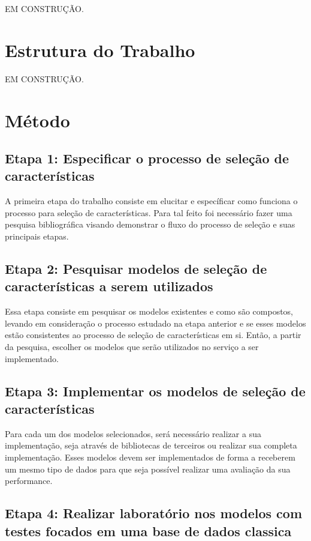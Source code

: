 EM CONSTRUÇÃO.

\section{Estrutura do Trabalho}

EM CONSTRUÇÃO.

\section{Método}

\subsection{Etapa 1: Especificar o processo de seleção de características}

A primeira etapa do trabalho consiste em elucitar e específicar como funciona o processo para seleção de características. Para tal feito foi necessário fazer uma pesquisa bibliográfica visando demonstrar o fluxo do processo de seleção e suas principais etapas.

\subsection{Etapa 2: Pesquisar modelos de seleção de características a serem utilizados}

Essa etapa consiste em pesquisar os modelos existentes e como são compostos, levando em consideração o processo estudado na etapa anterior e se esses modelos estão consistentes ao processo de seleção de características em si. Então, a partir da pesquisa, escolher os modelos que serão utilizados no serviço a ser implementado.

\subsection{Etapa 3: Implementar os modelos de seleção de características}

Para cada um dos modelos selecionados, será necessário realizar a sua implementação, seja através de bibliotecas de terceiros ou realizar sua completa implementação. Esses modelos devem ser implementados de forma a receberem um mesmo tipo de dados para que seja possível realizar uma avaliação da sua performance.

\subsection{Etapa 4: Realizar laboratório nos modelos com testes focados em uma base de dados classica}

